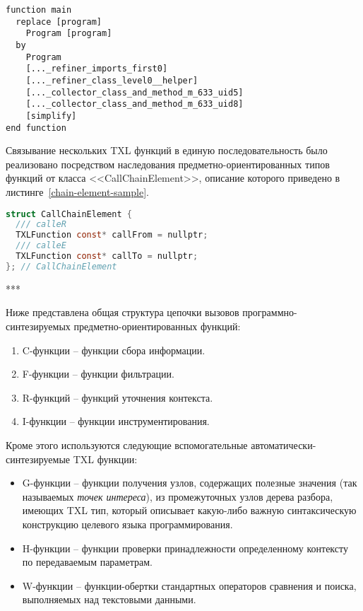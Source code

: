 \begin{lstlisting}[frame=single, language=TXL, label={main-example}, caption={Пример исходного текста главной функции.}]
function main
  replace [program]
    Program [program]
  by
    Program
    [..._refiner_imports_first0]
    [..._refiner_class_level0__helper]
    [..._collector_class_and_method_m_633_uid5]
    [..._collector_class_and_method_m_633_uid8]
    [simplify]
end function
\end{lstlisting}

Связывание нескольких TXL функций в единую последовательность было реализовано посредством наследования предметно-ориентированных типов функций от класса <<CallChainElement>>, описание которого приведено в листинге~\ref{chain-element-sample}.

\begin{lstlisting}[frame=single, language=C, label={chain-element-sample}, caption={Исходный код определения элемента цепочки вызовов.}]
struct CallChainElement {
  /// calleR
  TXLFunction const* callFrom = nullptr;
  /// calleE
  TXLFunction const* callTo = nullptr;
}; // CallChainElement
\end{lstlisting}

***

Ниже представлена общая структура цепочки вызовов программно-синтезируемых предметно-ориентированных функций:
\begin{enumerate}[noitemsep]
  \item C-функции -- функции сбора информации.
  \item F-функции -- функции фильтрации.
  \item R-функций -- функций уточнения контекста.
  \item I-функции -- функции инструментирования.
\end{enumerate}

Кроме этого используются следующие вспомогательные автоматически-синтезируемые TXL функции:
\begin{itemize}
  \item G-функции -- функции получения узлов, содержащих полезные значения (так называемых \textit{точек интереса}), из промежуточных узлов дерева разбора, имеющих TXL тип, который описывает какую-либо важную синтаксическую конструкцию целевого языка программирования.
  \item H-функции -- функции проверки принадлежности определенному контексту по передаваемым параметрам.
  \item W-функции -- функции-обертки стандартных операторов сравнения и поиска, выполняемых над текстовыми данными.
\end{itemize}

